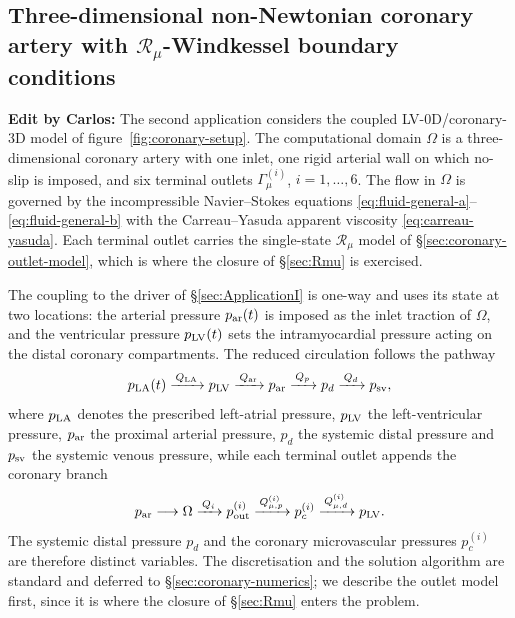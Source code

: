 \documentclass[lineno]{jfm}
\newcommand{\cbp}[1]{{\color{blue} \textbf{Edit by Carlos:} #1}}
\begin{document}
\subsection{Three-dimensional non-Newtonian coronary artery with
\texorpdfstring{$\mathcal{R}_{\mu}$}{Rmu}-Windkessel boundary conditions}
\label{sec:ApplicationII}

\cbp{
The second application considers the coupled LV-0D/coronary-3D model of
figure~\ref{fig:coronary-setup}. The computational domain $\Omega$ is a
three-dimensional coronary artery with one inlet, one rigid arterial wall on
which no-slip is imposed, and six terminal outlets $\Gamma_\mu^{(i)}$,
$i=1,\ldots,6$. The flow in $\Omega$ is governed by the incompressible
Navier--Stokes equations \eqref{eq:fluid-general-a}--\eqref{eq:fluid-general-b}
with the Carreau--Yasuda apparent viscosity \eqref{eq:carreau-yasuda}. Each
terminal outlet carries the single-state $\mathcal{R}_{\mu}$ model of
\S\ref{sec:coronary-outlet-model}, which is where the closure of
\S\ref{sec:Rmu} is exercised.

The coupling to the driver of \S\ref{sec:ApplicationI} is one-way and uses its
state at two locations: the arterial pressure $p_{\rm ar}(t)$ is imposed as
the inlet traction of $\Omega$, and the ventricular pressure $p_{\rm LV}(t)$
sets the intramyocardial pressure acting on the distal coronary compartments.
The reduced circulation follows the pathway
\begin{equation}
p_{\rm LA}(t)
\xrightarrow{\,Q_{\rm LA}\,}
p_{\rm LV}
\xrightarrow{\,Q_{\rm ar}\,}
p_{\rm ar}
\xrightarrow{\,Q_p\,}
p_d
\xrightarrow{\,Q_d\,}
p_{\rm sv},
\label{eq:lv0d-flow-topology}
\end{equation}
where $p_{\rm LA}$ denotes the prescribed left-atrial pressure, $p_{\rm LV}$
the left-ventricular pressure, $p_{\rm ar}$ the proximal arterial pressure,
$p_d$ the systemic distal pressure and $p_{\rm sv}$ the systemic venous
pressure, while each terminal outlet appends the coronary branch
\begin{equation}
p_{\rm ar}
\longrightarrow
\Omega
\xrightarrow{\,Q_i\,}
p_{\rm out}^{(i)}
\xrightarrow{\,Q_{\mu,p}^{(i)}\,}
p_c^{(i)}
\xrightarrow{\,Q_{\mu,d}^{(i)}\,}
p_{\rm LV}.
\label{eq:coronary-flow-topology}
\end{equation}
The systemic distal pressure $p_d$ and the coronary microvascular pressures
$p_c^{(i)}$ are therefore distinct variables. The discretisation and the
solution algorithm are standard and deferred to \S\ref{sec:coronary-numerics};
we describe the outlet model first, since it is where the closure of
\S\ref{sec:Rmu} enters the problem.
}
\end{document}
